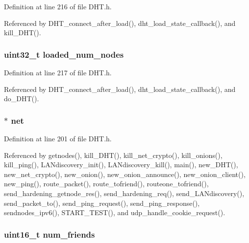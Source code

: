 Definition at line 216 of file D\+H\+T.\+h.



Referenced by D\+H\+T\+\_\+connect\+\_\+after\+\_\+load(), dht\+\_\+load\+\_\+state\+\_\+callback(), and kill\+\_\+\+D\+H\+T().

\hypertarget{struct_d_h_t_aef4ce67d5df5f093247c73b3a024b73e}{
\subsubsection[{loaded\+\_\+num\+\_\+nodes}]{\setlength{\rightskip}{0pt plus 5cm}uint32\+\_\+t loaded\+\_\+num\+\_\+nodes}}\label{struct_d_h_t_aef4ce67d5df5f093247c73b3a024b73e}


Definition at line 217 of file D\+H\+T.\+h.



Referenced by D\+H\+T\+\_\+connect\+\_\+after\+\_\+load(), dht\+\_\+load\+\_\+state\+\_\+callback(), and do\+\_\+\+D\+H\+T().

\hypertarget{struct_d_h_t_aa14ea2f67950f57fe4235d7375a2216c}{
\subsubsection[{net}]{$\ast$ net}}\label{struct_d_h_t_aa14ea2f67950f57fe4235d7375a2216c}


Definition at line 201 of file D\+H\+T.\+h.



Referenced by getnodes(), kill\+\_\+\+D\+H\+T(), kill\+\_\+net\+\_\+crypto(), kill\+\_\+onions(), kill\+\_\+ping(), L\+A\+Ndiscovery\+\_\+init(), L\+A\+Ndiscovery\+\_\+kill(), main(), new\+\_\+\+D\+H\+T(), new\+\_\+net\+\_\+crypto(), new\+\_\+onion(), new\+\_\+onion\+\_\+announce(), new\+\_\+onion\+\_\+client(), new\+\_\+ping(), route\+\_\+packet(), route\+\_\+tofriend(), routeone\+\_\+tofriend(), send\+\_\+hardening\+\_\+getnode\+\_\+res(), send\+\_\+hardening\+\_\+req(), send\+\_\+\+L\+A\+Ndiscovery(), send\+\_\+packet\+\_\+to(), send\+\_\+ping\+\_\+request(), send\+\_\+ping\+\_\+response(), sendnodes\+\_\+ipv6(), S\+T\+A\+R\+T\+\_\+\+T\+E\+S\+T(), and udp\+\_\+handle\+\_\+cookie\+\_\+request().

\hypertarget{struct_d_h_t_a8ee1f2d7e543bce350c591a8eaac0cf8}{
\subsubsection[{num\+\_\+friends}]{\setlength{\rightskip}{0pt plus 5cm}uint16\+\_\+t num\+\_\+friends}}\label{struct_d_h_t_a8ee1f2d7e543bce350c591a8eaac0cf8}


